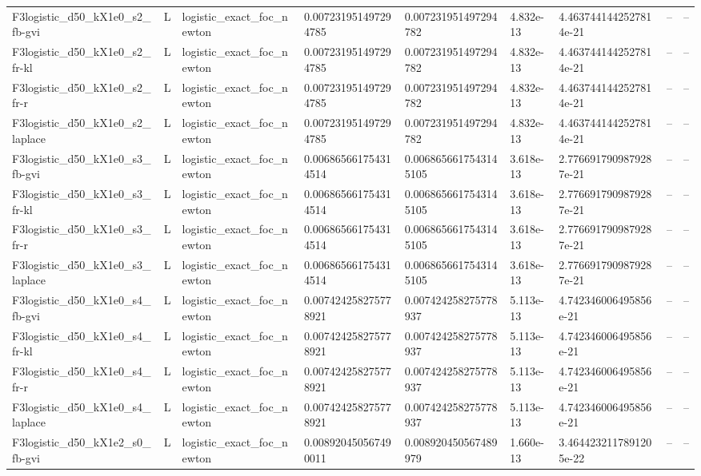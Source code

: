 \begin{tabular}{lllllllll}
F3logistic\_d50\_kX1e0\_s2\_fb-gvi & L & logistic\_exact\_foc\_newton & 0.007231951497294785 & 0.007231951497294782 & 4.832e-13 & 4.4637441442527814e-21 & -- & -- \\
F3logistic\_d50\_kX1e0\_s2\_fr-kl & L & logistic\_exact\_foc\_newton & 0.007231951497294785 & 0.007231951497294782 & 4.832e-13 & 4.4637441442527814e-21 & -- & -- \\
F3logistic\_d50\_kX1e0\_s2\_fr-r & L & logistic\_exact\_foc\_newton & 0.007231951497294785 & 0.007231951497294782 & 4.832e-13 & 4.4637441442527814e-21 & -- & -- \\
F3logistic\_d50\_kX1e0\_s2\_laplace & L & logistic\_exact\_foc\_newton & 0.007231951497294785 & 0.007231951497294782 & 4.832e-13 & 4.4637441442527814e-21 & -- & -- \\
F3logistic\_d50\_kX1e0\_s3\_fb-gvi & L & logistic\_exact\_foc\_newton & 0.006865661754314514 & 0.0068656617543145105 & 3.618e-13 & 2.7766917909879287e-21 & -- & -- \\
F3logistic\_d50\_kX1e0\_s3\_fr-kl & L & logistic\_exact\_foc\_newton & 0.006865661754314514 & 0.0068656617543145105 & 3.618e-13 & 2.7766917909879287e-21 & -- & -- \\
F3logistic\_d50\_kX1e0\_s3\_fr-r & L & logistic\_exact\_foc\_newton & 0.006865661754314514 & 0.0068656617543145105 & 3.618e-13 & 2.7766917909879287e-21 & -- & -- \\
F3logistic\_d50\_kX1e0\_s3\_laplace & L & logistic\_exact\_foc\_newton & 0.006865661754314514 & 0.0068656617543145105 & 3.618e-13 & 2.7766917909879287e-21 & -- & -- \\
F3logistic\_d50\_kX1e0\_s4\_fb-gvi & L & logistic\_exact\_foc\_newton & 0.007424258275778921 & 0.007424258275778937 & 5.113e-13 & 4.742346006495856e-21 & -- & -- \\
F3logistic\_d50\_kX1e0\_s4\_fr-kl & L & logistic\_exact\_foc\_newton & 0.007424258275778921 & 0.007424258275778937 & 5.113e-13 & 4.742346006495856e-21 & -- & -- \\
F3logistic\_d50\_kX1e0\_s4\_fr-r & L & logistic\_exact\_foc\_newton & 0.007424258275778921 & 0.007424258275778937 & 5.113e-13 & 4.742346006495856e-21 & -- & -- \\
F3logistic\_d50\_kX1e0\_s4\_laplace & L & logistic\_exact\_foc\_newton & 0.007424258275778921 & 0.007424258275778937 & 5.113e-13 & 4.742346006495856e-21 & -- & -- \\
F3logistic\_d50\_kX1e2\_s0\_fb-gvi & L & logistic\_exact\_foc\_newton & 0.008920450567490011 & 0.008920450567489979 & 1.660e-13 & 3.4644232117891205e-22 & -- & -- \\

\end{tabular}
